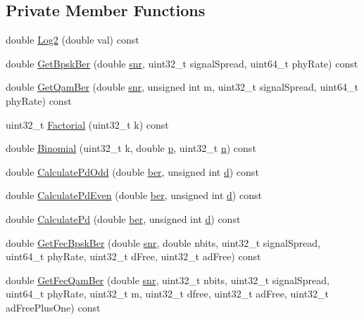 \subsection*{Private Member Functions}
\begin{DoxyCompactItemize}
\item 
double \hyperlink{classns3_1_1YansErrorRateModel_ab95b088d11aeb697e6a0bd2db7a12c5e}{Log2} (double val) const 
\item 
double \hyperlink{classns3_1_1YansErrorRateModel_ad4c62caef16f98caaa84f732e2f0ce68}{Get\+Bpsk\+Ber} (double \hyperlink{lte__pathloss_8m_ae6e82a215dff6b79fb6e9952a1b78453}{snr}, uint32\+\_\+t signal\+Spread, uint64\+\_\+t phy\+Rate) const 
\item 
double \hyperlink{classns3_1_1YansErrorRateModel_a73c901030ed43248a527379d4227e0b9}{Get\+Qam\+Ber} (double \hyperlink{lte__pathloss_8m_ae6e82a215dff6b79fb6e9952a1b78453}{snr}, unsigned int m, uint32\+\_\+t signal\+Spread, uint64\+\_\+t phy\+Rate) const 
\item 
uint32\+\_\+t \hyperlink{classns3_1_1YansErrorRateModel_af74773f1476eb157d06c67500bf636c8}{Factorial} (uint32\+\_\+t k) const 
\item 
double \hyperlink{classns3_1_1YansErrorRateModel_a7d43b7444a4af7ad0d56f285ebe06bf5}{Binomial} (uint32\+\_\+t k, double \hyperlink{lte__link__budget__x2__handover__measures_8m_ac9de518908a968428863f829398a4e62}{p}, uint32\+\_\+t \hyperlink{lte__link__budget__x2__handover__measures_8m_abdb05bc5a064cf642a06c83b3392f148}{n}) const 
\item 
double \hyperlink{classns3_1_1YansErrorRateModel_a602143c06ab2a0a320ad1b01fc8f3fca}{Calculate\+Pd\+Odd} (double \hyperlink{lte__ue__measurements_8m_a8320b665cd9f5639cb929c78d5a41af7}{ber}, unsigned int \hyperlink{lte__pathloss_8m_a1aabac6d068eef6a7bad3fdf50a05cc8}{d}) const 
\item 
double \hyperlink{classns3_1_1YansErrorRateModel_ac83ae34ee93e89d32b42c3c97ff37090}{Calculate\+Pd\+Even} (double \hyperlink{lte__ue__measurements_8m_a8320b665cd9f5639cb929c78d5a41af7}{ber}, unsigned int \hyperlink{lte__pathloss_8m_a1aabac6d068eef6a7bad3fdf50a05cc8}{d}) const 
\item 
double \hyperlink{classns3_1_1YansErrorRateModel_a230a0884925ebbb368053c821116e3ec}{Calculate\+Pd} (double \hyperlink{lte__ue__measurements_8m_a8320b665cd9f5639cb929c78d5a41af7}{ber}, unsigned int \hyperlink{lte__pathloss_8m_a1aabac6d068eef6a7bad3fdf50a05cc8}{d}) const 
\item 
double \hyperlink{classns3_1_1YansErrorRateModel_abaa04063a406c62365d182fbd9eb78ec}{Get\+Fec\+Bpsk\+Ber} (double \hyperlink{lte__pathloss_8m_ae6e82a215dff6b79fb6e9952a1b78453}{snr}, double nbits, uint32\+\_\+t signal\+Spread, uint64\+\_\+t phy\+Rate, uint32\+\_\+t d\+Free, uint32\+\_\+t ad\+Free) const 
\item 
double \hyperlink{classns3_1_1YansErrorRateModel_a456a5ba3fc8c6a9fe67ed25971364ff0}{Get\+Fec\+Qam\+Ber} (double \hyperlink{lte__pathloss_8m_ae6e82a215dff6b79fb6e9952a1b78453}{snr}, uint32\+\_\+t nbits, uint32\+\_\+t signal\+Spread, uint64\+\_\+t phy\+Rate, uint32\+\_\+t m, uint32\+\_\+t dfree, uint32\+\_\+t ad\+Free, uint32\+\_\+t ad\+Free\+Plus\+One) const 
\end{DoxyCompactItemize}
